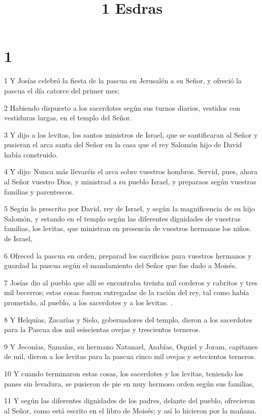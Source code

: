 

\title{1 Esdras}


\chapter{1}

\par 1 Y Josías celebró la fiesta de la pascua en Jerusalén a su Señor, y ofreció la pascua el día catorce del primer mes;
\par 2 Habiendo dispuesto a los sacerdotes según sus turnos diarios, vestidos con vestiduras largas, en el templo del Señor.
\par 3 Y dijo a los levitas, los santos ministros de Israel, que se santificaran al Señor y pusieran el arca santa del Señor en la casa que el rey Salomón hijo de David había construido.
\par 4 Y dijo: Nunca más llevaréis el arca sobre vuestros hombros. Servid, pues, ahora al Señor vuestro Dios, y ministrad a su pueblo Israel, y preparaos según vuestras familias y parentescos.
\par 5 Según lo prescrito por David, rey de Israel, y según la magnificencia de su hijo Salomón, y estando en el templo según las diferentes dignidades de vuestras familias, los levitas, que ministran en presencia de vuestros hermanos los niños. de Israel,
\par 6 Ofreced la pascua en orden, preparad los sacrificios para vuestros hermanos y guardad la pascua según el mandamiento del Señor que fue dado a Moisés.
\par 7 Josías dio al pueblo que allí se encontraba treinta mil corderos y cabritos y tres mil becerros; estas cosas fueron entregadas de la ración del rey, tal como había prometido, al pueblo, a los sacerdotes y a los levitas. .
\par 8 Y Helquías, Zacarías y Sielo, gobernadores del templo, dieron a los sacerdotes para la Pascua dos mil seiscientas ovejas y trescientos terneros.
\par 9 Y Jeconías, Samaías, su hermano Natanael, Asabías, Oquiel y Joram, capitanes de mil, dieron a los levitas para la pascua cinco mil ovejas y setecientos terneros.
\par 10 Y cuando terminaron estas cosas, los sacerdotes y los levitas, teniendo los panes sin levadura, se pusieron de pie en muy hermoso orden según sus familias,
\par 11 Y según las diferentes dignidades de los padres, delante del pueblo, ofrecieron al Señor, como está escrito en el libro de Moisés; y así lo hicieron por la mañana.
